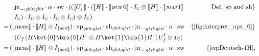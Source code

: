 \begin{align*}
  \hspace{-25pt} & \cdot \text{jn}_{-;\textit{qbit}; \textit{qbit}} \cdot \alpha  \cdot \text{sw}\cdot ((\llbracket U_f \rrbracket \cdot (\llbracket H \rrbracket \cdot \llbracket  \textit{new}   \hspace{2pt}  0  \rrbracket \cdot I_{\mathbb{C}}  \otimes \llbracket H \rrbracket \cdot \llbracket  \textit{new}   \hspace{2pt}  1  \rrbracket & \text{Def. sp and sh} \}     \\
  &\cdot I_{\mathbb{C}}) \cdot  I_{\mathbb{C}} \otimes I_{\mathbb{C}} \cdot  I_{\mathbb{C}} \otimes I_{\mathbb{C}}) \otimes I_{\mathbb{C}})\\
   \hspace{-25pt} =  \hspace{2pt} &  (\llbracket \text{meas} \rrbracket \cdot \llbracket H \rrbracket   \otimes I_{\llbracket \textit{qbit} \rrbracket} ) \cdot \text{sp}_{\textit{qbit};\textit{qbit}} \cdot \text{sh}_{\textit{qbit};\textit{qbit}} \cdot \text{jn}_{-;\textit{qbit}; \textit{qbit}} \cdot \alpha \cdot \text{sw}  &  \{\text{\autoref{fig:interpret_ops_0}} \}\\
   \hspace{-25pt} & \cdot (U_f \hspace{1pt} (H \ket{0}\bra{0} H^{\dag} \otimes H \ket{1}\bra{1} H^{\dag}) \hspace{1pt} U_f^{\dag} \otimes  I_{\mathbb{C}})  \\
   \hspace{-25pt} =  \hspace{2pt} &  (\llbracket \text{meas} \rrbracket \cdot \llbracket H \rrbracket   \otimes I_{\llbracket \textit{qbit} \rrbracket} ) \cdot \text{sp}_{\textit{qbit};\textit{qbit}} \cdot \text{sh}_{\textit{qbit};\textit{qbit}} \cdot \text{jn}_{-;\textit{qbit}; \textit{qbit}} \cdot \alpha \cdot \text{sw} &   \{\text{\autoref{eq:Deutsch-1H}}, \\

\end{align*}
